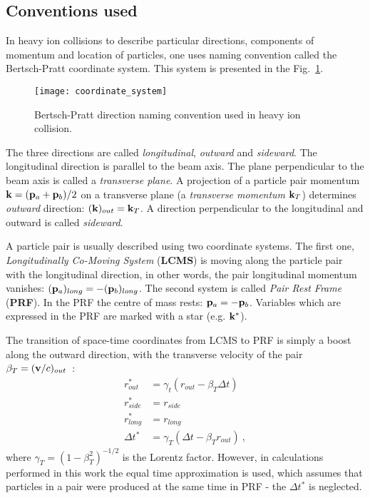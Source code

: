     \subsection{Conventions used}
      In heavy ion collisions to describe particular directions, components of momentum and location of particles, one uses naming convention called the Bertsch-Pratt coordinate system.
      This system is presented in the Fig.~\ref{fig:coordinate-system}.
      \begin{figure}[h]
        \centering
        \texttt{[image: coordinate\_system]}
        \caption{Bertsch-Pratt direction naming convention used in heavy ion collision.}
        \label{fig:coordinate-system}
      \end{figure}
      The three directions are called \textit{longitudinal}, \textit{outward} and \textit{sideward}.
      The longitudinal direction is parallel to the beam axis.
      The plane perpendicular to the beam axis is called a \textit{transverse plane}.
      A projection of a particle pair momentum $\mathbf{k} = (\mathbf{p}_a + \mathbf{p}_b)/2$ on a transverse plane (a \textit{transverse momentum} $\mathbf{k}_T$) determines \textit{outward} direction: $(\mathbf{k})_{out} = \mathbf{k}_T$.
      A direction perpendicular to the longitudinal and outward is called \textit{sideward}.

      A particle pair is usually described using two coordinate systems.
      The first one, \textit{Longitudinally Co-Moving System} (\textbf{LCMS}) is moving along the particle pair with the longitudinal direction, in other words, the pair longitudinal momentum vanishes: $(\mathbf{p}_a)_{long} = -(\mathbf{p}_b)_{long} $.
      The second system is called \textit{Pair Rest Frame} (\textbf{PRF}).
      In the PRF the centre of mass rests: $\mathbf{p}_a = -\mathbf{p}_b$.
      Variables which are expressed in the PRF are marked with a star (e.g. $\mathbf{k}^{*}$).

      The transition of space-time coordinates from LCMS to PRF is simply a boost along the outward direction, with the transverse velocity of the pair~$\beta_T = (\mathbf{v}/c)_{out}$~\cite{nonidfemto}:
      \begin{align}
        \label{eq:lcmstoprf}
        r^{*}_{out} &= \gamma_{t}(r_{out} - \beta_T \Delta t)\\
        r^{*}_{side} &= r_{side}\\
        r^{*}_{long} &= r_{long}\\
        \Delta t^{*} &= \gamma_T(\Delta t - \beta_T r_{out})~, 
      \end{align}
      where $\gamma_T = (1-\beta^{2}_T)^{-1/2}$ is the Lorentz factor.
      However, in calculations performed in this work the equal time approximation is used, which assumes that particles in a pair were produced at the same time in PRF - the $\Delta t^{*}$ is neglected.

